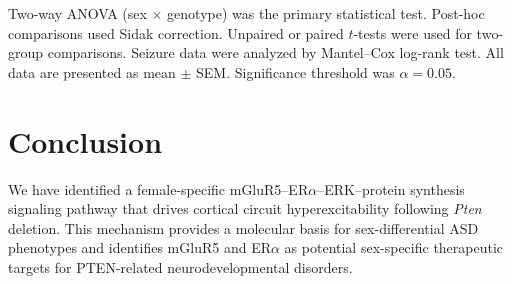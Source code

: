 \documentclass[11pt]{article}
\begin{document}
Two-way ANOVA (sex $\times$ genotype) was the primary statistical test. Post-hoc comparisons used Sidak correction. Unpaired or paired $t$-tests were used for two-group comparisons. Seizure data were analyzed by Mantel--Cox log-rank test. All data are presented as mean $\pm$ SEM. Significance threshold was $\alpha = 0.05$.

\section{Conclusion}

We have identified a female-specific mGluR5--ER$\alpha$--ERK--protein synthesis signaling pathway that drives cortical circuit hyperexcitability following \textit{Pten} deletion. This mechanism provides a molecular basis for sex-differential ASD phenotypes and identifies mGluR5 and ER$\alpha$ as potential sex-specific therapeutic targets for PTEN-related neurodevelopmental disorders.



\end{document}
